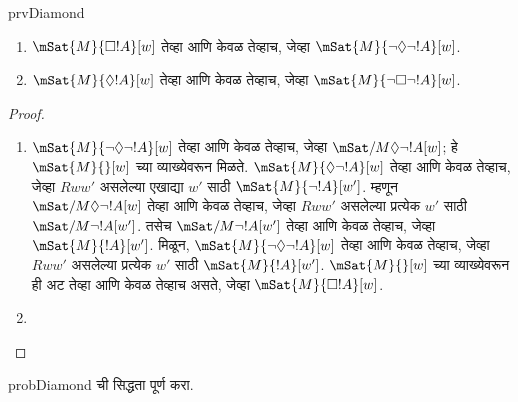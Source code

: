 \documentclass[../../../include/open-logic-section]{subfiles}
\begin{document}
\begin{tagblock}{prvDiamond}
\begin{prop}
  \begin{enumerate}
  \item $\mSat{M}{\Box !A}[w]$ तेव्हा आणि केवळ तेव्हाच, जेव्हा $\mSat{M}{\lnot\Diamond\lnot !A}[w]$.
  \item $\mSat{M}{\Diamond !A}[w]$ तेव्हा आणि केवळ तेव्हाच, जेव्हा $\mSat{M}{\lnot\Box\lnot !A}[w]$.
  \end{enumerate}
\end{prop}

\begin{proof}
  \begin{enumerate}
    \item $\mSat{M}{\lnot\Diamond\lnot !A}[w]$ तेव्हा आणि केवळ
      तेव्हाच, जेव्हा $\mSat/{M}{\Diamond\lnot !A}[w]$;
      हे $\mSat{M}{}[w]$ च्या व्याख्येवरून मिळते.
      $\mSat{M}{\Diamond\lnot !A}[w]$ तेव्हा आणि केवळ तेव्हाच,
      जेव्हा $Rww'$ असलेल्या एखाद्या $w'$ साठी
      $\mSat{M}{\lnot !A}[w']$. म्हणून
      $\mSat/{M}{\Diamond\lnot !A}[w]$ तेव्हा आणि केवळ तेव्हाच,
      जेव्हा $Rww'$ असलेल्या प्रत्येक $w'$ साठी
      $\mSat/{M}{\lnot !A}[w']$. तसेच
      $\mSat/{M}{\lnot !A}[w']$ तेव्हा आणि केवळ तेव्हाच,
      जेव्हा $\mSat{M}{!A}[w']$. मिळून,
      $\mSat{M}{\lnot\Diamond\lnot !A}[w]$ तेव्हा आणि केवळ
      तेव्हाच, जेव्हा $Rww'$ असलेल्या प्रत्येक $w'$ साठी
      $\mSat{M}{!A}[w']$. $\mSat{M}{}[w]$ च्या व्याख्येवरून
      ही अट तेव्हा आणि केवळ तेव्हाच असते, जेव्हा
      $\mSat{M}{\Box !A}[w]$.
    \item {}
  \end{enumerate}
\end{proof}

\begin{probtag}{probDiamond}
   ची सिद्धता पूर्ण करा.
\end{probtag}
\end{tagblock}
\end{document}
